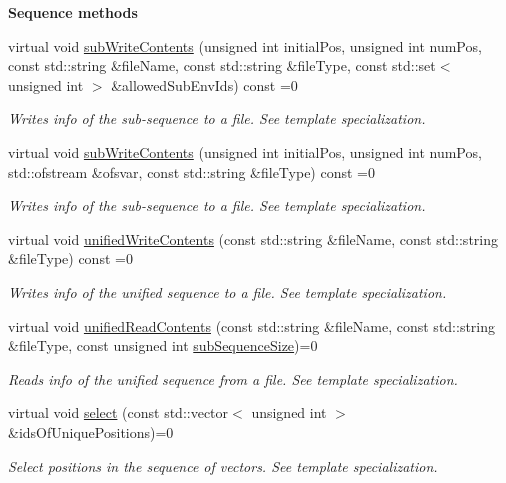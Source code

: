 \begin{Indent}{\bf Sequence methods}
\begin{DoxyCompactItemize}
virtual void \hyperlink{class_q_u_e_s_o_1_1_base_vector_sequence_aa59738c6df15b1b369b90f0d025fb6f2}{sub\-Write\-Contents} (unsigned int initial\-Pos, unsigned int num\-Pos, const std\-::string \&file\-Name, const std\-::string \&file\-Type, const std\-::set$<$ unsigned int $>$ \&allowed\-Sub\-Env\-Ids) const =0
\begin{DoxyCompactList}\small\item\em Writes info of the sub-\/sequence to a file. See template specialization. \end{DoxyCompactList}\item 
virtual void \hyperlink{class_q_u_e_s_o_1_1_base_vector_sequence_a7226d1093a7ab07792410414237f08da}{sub\-Write\-Contents} (unsigned int initial\-Pos, unsigned int num\-Pos, std\-::ofstream \&ofsvar, const std\-::string \&file\-Type) const =0
\begin{DoxyCompactList}\small\item\em Writes info of the sub-\/sequence to a file. See template specialization. \end{DoxyCompactList}\item 
virtual void \hyperlink{class_q_u_e_s_o_1_1_base_vector_sequence_a3987ee6d026842e4ddaeaf0bc850ef83}{unified\-Write\-Contents} (const std\-::string \&file\-Name, const std\-::string \&file\-Type) const =0
\begin{DoxyCompactList}\small\item\em Writes info of the unified sequence to a file. See template specialization. \end{DoxyCompactList}\item 
virtual void \hyperlink{class_q_u_e_s_o_1_1_base_vector_sequence_afcb5935b592ab2e7ee39d23b08bcce62}{unified\-Read\-Contents} (const std\-::string \&file\-Name, const std\-::string \&file\-Type, const unsigned int \hyperlink{class_q_u_e_s_o_1_1_base_vector_sequence_afd6278702d40bdf1044697bbd6ad1957}{sub\-Sequence\-Size})=0
\begin{DoxyCompactList}\small\item\em Reads info of the unified sequence from a file. See template specialization. \end{DoxyCompactList}\item 
virtual void \hyperlink{class_q_u_e_s_o_1_1_base_vector_sequence_a4ff00d9659c59653844b78410571f3fe}{select} (const std\-::vector$<$ unsigned int $>$ \&ids\-Of\-Unique\-Positions)=0
\begin{DoxyCompactList}\small\item\em Select positions in the sequence of vectors. See template specialization. \end{DoxyCompactList}\item 

\end{DoxyCompactItemize}
\end{Indent}
